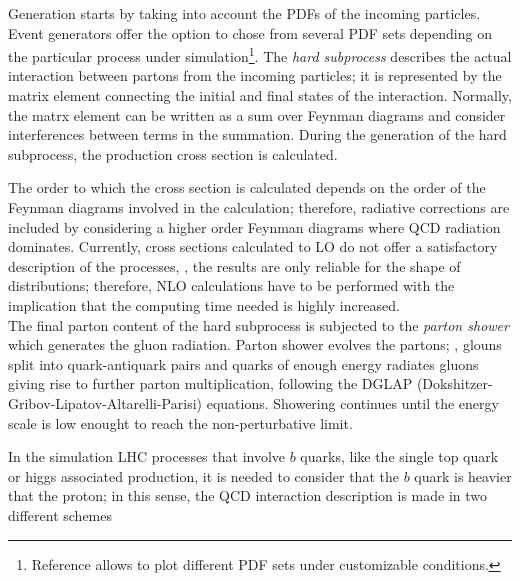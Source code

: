 \noindent Generation starts by taking into account the PDFs of the incoming particles. Event generators offer the option to chose from several PDF sets depending on the particular process under simulation\footnote{Reference \cite{pdfplot} allows to plot different PDF sets under customizable conditions.}. The \textit{hard subprocess} describes the actual interaction between partons from the incoming particles; it is represented by the matrix element connecting the initial and final states of the interaction. Normally, the matrx element can be written as a sum over Feynman diagrams and consider interferences between terms in the summation. During the generation of the hard subprocess, the production cross section is calculated. 

\noindent The order to which the cross section is calculated depends on the order of the Feynman diagrams involved in the calculation; therefore, radiative corrections are included by considering a higher order Feynman diagrams where QCD radiation dominates. Currently, cross sections calculated to LO do not offer a satisfactory description of the processes, \ie, the results are only reliable for the shape of distributions; therefore, NLO calculations have to be performed with the implication that the computing time needed is highly increased.\\       

\noindent The final parton content of the hard subprocess is subjected to the \textit{parton shower} which generates the gluon radiation. Parton shower evolves the partons; \ie, glouns split into quark-antiquark pairs and quarks of enough energy radiates gluons giving rise to further parton multiplication, following the DGLAP (Dokshitzer-Gribov-Lipatov-Altarelli-Parisi) equations. Showering continues until the energy scale is low enought to reach the non-perturbative limit.   

\noindent In the simulation LHC processes that involve $b$ quarks, like the single top quark or higgs associated production, it is needed to consider that the $b$ quark is heavier that the proton; in this sense, the QCD interaction description is made in two different schemes \cite{schemes}

